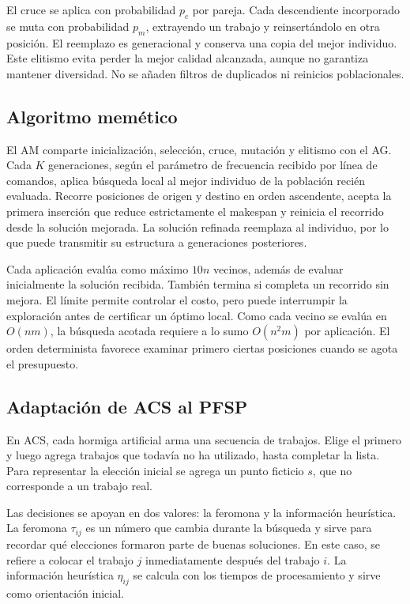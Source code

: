 \documentclass[journal]{IEEEtran}
\begin{document}
El cruce se aplica con probabilidad $p_c$ por pareja. Cada descendiente incorporado se muta con probabilidad $p_m$, extrayendo un trabajo y reinsertándolo en otra posición. El reemplazo es generacional y conserva una copia del mejor individuo. Este elitismo evita perder la mejor calidad alcanzada, aunque no garantiza mantener diversidad. No se añaden filtros de duplicados ni reinicios poblacionales.

\subsection{Algoritmo memético}
El AM comparte inicialización, selección, cruce, mutación y elitismo con el AG. Cada $K$ generaciones, según el parámetro de frecuencia recibido por línea de comandos, aplica búsqueda local al mejor individuo de la población recién evaluada. Recorre posiciones de origen y destino en orden ascendente, acepta la primera inserción que reduce estrictamente el makespan y reinicia el recorrido desde la solución mejorada. La solución refinada reemplaza al individuo, por lo que puede transmitir su estructura a generaciones posteriores.

Cada aplicación evalúa como máximo $10n$ vecinos, además de evaluar inicialmente la solución recibida. También termina si completa un recorrido sin mejora. El límite permite controlar el costo, pero puede interrumpir la exploración antes de certificar un óptimo local. Como cada vecino se evalúa en $O(nm)$, la búsqueda acotada requiere a lo sumo $O(n^2m)$ por aplicación. El orden determinista favorece examinar primero ciertas posiciones cuando se agota el presupuesto.

\subsection{Adaptación de ACS al PFSP}
En ACS, cada hormiga artificial arma una secuencia de trabajos. Elige el primero y luego agrega trabajos que todavía no ha utilizado, hasta completar la lista. Para representar la elección inicial se agrega un punto ficticio $s$, que no corresponde a un trabajo real.

Las decisiones se apoyan en dos valores: la feromona y la información heurística. La feromona $\tau_{ij}$ es un número que cambia durante la búsqueda y sirve para recordar qué elecciones formaron parte de buenas soluciones. En este caso, se refiere a colocar el trabajo $j$ inmediatamente después del trabajo $i$. La información heurística $\eta_{ij}$ se calcula con los tiempos de procesamiento y sirve como orientación inicial.
\end{document}
